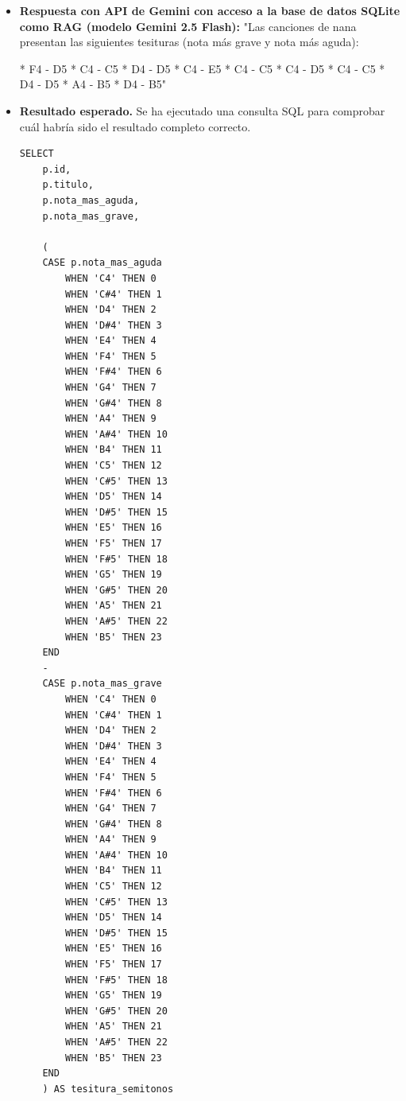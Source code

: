 \begin{itemize}
Sin embargo, es importante destacar que estas diferencias son relativamente pequeñas y pueden no ser apreciables en una interpretación a oídos despiertos. La tesitura de las dos canciones de nana sigue siendo similar y podrían considerarse como versiones ligeramente diferentes de la misma melodía.

En resumen, aunque hay algunas diferencias sutiles entre la tesitura de ambas canciones de nana, no hay un contraste dramático en términos de rango de notas."
\item \textbf{Respuesta con API de Gemini con acceso a la base de datos SQLite como RAG (modelo Gemini 2.5 Flash):} "Las canciones de nana presentan las siguientes tesituras (nota más grave y nota más aguda):

*   F4 - D5
*   C4 - C5
*   D4 - D5
*   C4 - E5
*   C4 - C5
*   C4 - D5
*   C4 - C5
*   D4 - D5
*   A4 - B5
*   D4 - B5"
    \item \textbf{Resultado esperado.} Se ha ejecutado una consulta SQL para comprobar cuál habría sido el resultado completo correcto.
    \begin{verbatim}
SELECT 
    p.id,
    p.titulo,
    p.nota_mas_aguda,
    p.nota_mas_grave,
    
    (
    CASE p.nota_mas_aguda
        WHEN 'C4' THEN 0
        WHEN 'C#4' THEN 1
        WHEN 'D4' THEN 2
        WHEN 'D#4' THEN 3
        WHEN 'E4' THEN 4
        WHEN 'F4' THEN 5
        WHEN 'F#4' THEN 6
        WHEN 'G4' THEN 7
        WHEN 'G#4' THEN 8
        WHEN 'A4' THEN 9
        WHEN 'A#4' THEN 10
        WHEN 'B4' THEN 11
        WHEN 'C5' THEN 12
        WHEN 'C#5' THEN 13
        WHEN 'D5' THEN 14
        WHEN 'D#5' THEN 15
        WHEN 'E5' THEN 16
        WHEN 'F5' THEN 17
        WHEN 'F#5' THEN 18
        WHEN 'G5' THEN 19
        WHEN 'G#5' THEN 20
        WHEN 'A5' THEN 21
        WHEN 'A#5' THEN 22
        WHEN 'B5' THEN 23
    END
    -
    CASE p.nota_mas_grave
        WHEN 'C4' THEN 0
        WHEN 'C#4' THEN 1
        WHEN 'D4' THEN 2
        WHEN 'D#4' THEN 3
        WHEN 'E4' THEN 4
        WHEN 'F4' THEN 5
        WHEN 'F#4' THEN 6
        WHEN 'G4' THEN 7
        WHEN 'G#4' THEN 8
        WHEN 'A4' THEN 9
        WHEN 'A#4' THEN 10
        WHEN 'B4' THEN 11
        WHEN 'C5' THEN 12
        WHEN 'C#5' THEN 13
        WHEN 'D5' THEN 14
        WHEN 'D#5' THEN 15
        WHEN 'E5' THEN 16
        WHEN 'F5' THEN 17
        WHEN 'F#5' THEN 18
        WHEN 'G5' THEN 19
        WHEN 'G#5' THEN 20
        WHEN 'A5' THEN 21
        WHEN 'A#5' THEN 22
        WHEN 'B5' THEN 23
    END
    ) AS tesitura_semitonos


\end{verbatim}
\end{itemize}
